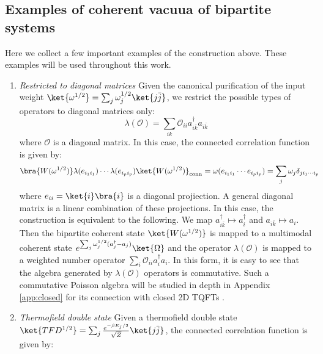 \documentclass[a4paper,11pt]{article}
\theoremstyle{definition}
\numberwithin{equation}{section}
\begin{document}
\subsection{Examples of coherent vacuua of bipartite systems}\label{subsection:coherentexamples}
Here we collect a few important examples of the construction above. These examples will be used throughout this work. 
\begin{enumerate}
    \item \textit{Restricted to diagonal matrices} Given the canonical purification of the input weight $\ket{\omega^{1/2}} = \sum_j \omega_j^{1/2}\ket{j\bar{j}}$, we restrict the possible types of operators to diagonal matrices only:
    \begin{equation}
        \lambda(\mathcal{O}) = \sum_{ik}\mathcal{O}_{ii}a^\dagger_{i\bar{k}}a_{i\bar{k}} 
    \end{equation}
    where $\mathcal{O}$ is a diagonal matrix. In this case, the connected correlation function is given by:
    \begin{align}\label{equation:diagonalconn}
        \begin{split}
            \bra{W(\omega^{1/2})}\lambda(e_{i_1i_1})\cdots\lambda(e_{i_pi_p})\ket{W(\omega^{1/2})}_\text{conn} &= \omega(e_{i_1i_1}\cdots e_{i_pi_p}) = \sum_j\omega_j\delta_{ji_1\cdots i_p}
        \end{split}
    \end{align}
    where $e_{ii} = \ket{i}\bra{i}$ is a diagonal projiection. A general diagonal matrix is a linear combination of these projections. In this case, the construction is equivalent to the following. We map $a^\dagger_{i\bar{k}}\mapsto a^\dagger_i$ and $a_{i\bar{k}}\mapsto a_i$. Then the bipartite coherent state $\ket{W(\omega^{1/2})}$ is mapped to a multimodal coherent state $e^{\sum_j \omega_j^{1/2}(a^\dagger_j -a_j)}\ket{\Omega}$ and the operator $\lambda(\mathcal{O})$ is mapped to a weighted number operator $\sum_i\mathcal{O}_{ii}a^\dagger_ia_i$. In this form, it is easy to see that the algebra generated by $\lambda(\mathcal{O})$ operators is commutative. Such a commutative Poisson algebra will be studied in depth in Appendix \ref{app:closed} for its connection with closed 2D TQFTs \cite{tqftreview, frobeniusTQFT2}.
    \item \textit{Thermofield double state} Given a thermofield double state $\ket{TFD^{1/2}} = \sum_j \frac{e^{-\beta E_j / 2}}{\sqrt{Z}}\ket{j\bar{j}}$, the connected correlation function is given by:
    \begin{align}\label{equation:diagonal}

\end{align}
\end{enumerate}
\end{document}
